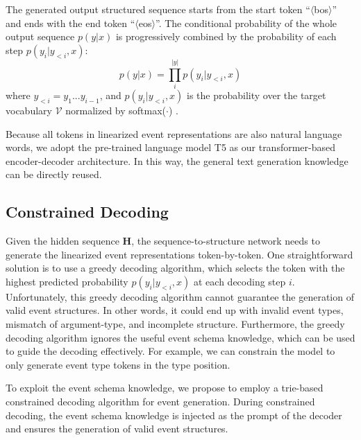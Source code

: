 \documentclass[11pt,a4paper]{article}
\begin{document}
The generated output structured sequence starts from the start token ``$\langle$bos$\rangle$'' and ends with the end token ``$\langle$eos$\rangle$''. The conditional probability of the whole output sequence $p(y|x)$ is progressively combined by the probability of each step $p(y_{i}|y_{<i},x)$:
\begin{equation}
    \label{equ:condition_prob}
    p(y|x) = \prod_{i}^{|y|} p(y_{i}|y_{<i},x)
\end{equation}
where $y_{<i}=y_{1} ... y_{i-1}$, and $p(y_{i}|y_{<i},x)$ is the probability over the target vocabulary $\mathcal{V}$ normalized by softmax($\cdot$) .

Because all tokens in linearized event representations are also natural language words, we adopt the pre-trained language model T5 \cite{Raffel:JMLR2020:T5} as our transformer-based encoder-decoder architecture.
In this way, the general text generation knowledge can be directly reused.

\subsection{Constrained Decoding} \label{sec:constrained_decoding}

Given the hidden sequence $\mathbf{H}$, the sequence-to-structure network needs to generate the linearized event representations token-by-token.
One straightforward solution is to use a greedy decoding algorithm, which selects the token with the highest predicted probability $p(y_{i}|y_{<i},x)$ at each decoding step $i$.
Unfortunately, this greedy decoding algorithm cannot guarantee the generation of valid event structures.
In other words, it could end up with invalid event types, mismatch of argument-type, and incomplete structure.
Furthermore, the greedy decoding algorithm ignores the useful event schema knowledge, which can be used to guide the decoding effectively.
For example, we can constrain the model to only generate event type tokens in the type position.

To exploit the event schema knowledge, we propose to employ a trie-based constrained decoding algorithm \citep{chen-etal-2020-parallel,decao2020autoregressive} for event generation.
During constrained decoding, the event schema knowledge is injected as the prompt of the decoder and ensures the generation of valid event structures.
\end{document}
